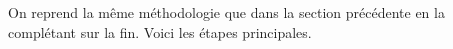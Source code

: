 On reprend la même méthodologie que dans la section précédente en la complétant sur la fin. Voici les étapes principales.

\begin{multicols}{2}

\emptybox\emptybox%
\emptybox\emptybox

\phantom{%
	\emptybox\emptybox}%
	\head
	

\medskip %

\emptybox\emptybox%
\emptybox\emptybox

\phantom{%
	\emptybox\emptybox%
	\emptybox\emptybox\emptybox\emptybox\emptybox\emptybox}%
	\head
	

\vfill\null
\columnbreak


\emptybox\emptybox%
	\emptybox{}\emptybox%
\emptybox\emptybox

\phantom{%
	\emptybox\emptybox\emptybox}%
	\head
	

\medskip %

\emptybox\emptybox%
	\emptybox{}\emptybox%
\emptybox\emptybox

\phantom{%
	\emptybox\emptybox%
	\emptybox\emptybox\emptybox\emptybox\emptybox}%
	\head

\vfill\null
\end{multicols}



